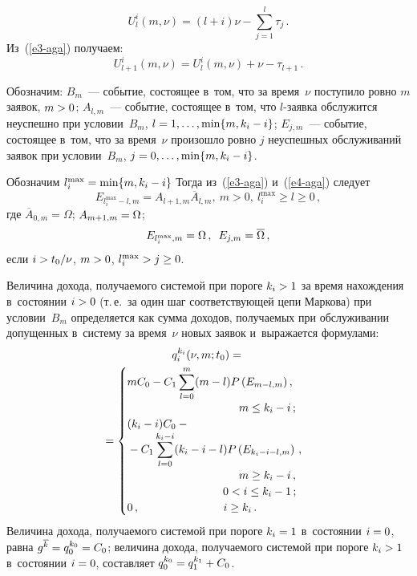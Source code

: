 \begin{multicols}{2}
  \noindent
  \begin{equation}
  U_l^i(m,\nu) =(l+i)\nu -\sum\limits_{j=1}^l \tau_j\,.
  \label{e3-aga}
  \end{equation}
Из~(\ref{e3-aga}) получаем:
\begin{equation}
U_{l+1}^i (m,\nu) =U_l^i(m,\nu) +\nu -\tau_{l+1}\,.
\label{e4-aga}
\end{equation}

  Обозначим: $B_m$~--- событие, состоящее в~том, что за время~$\nu$
поступило ровно $m$ заявок, $m\hm>0$; $A_{l,m}$~--- событие, состоящее в~том, что $l$-за\-яв\-ка обслужится неуспешно при условии~$B_m$, $l\hm=
1,\ldots, \min \{m,k_i\hm-i\}$; $E_{j,m}$~--- событие, состоящее в~том, что за
время~$\nu$ произошло ровно $j$ неуспешных обслуживаний заявок при
условии~$B_m$, $j\hm= 0,\ldots, \min \{m,k_i\hm-i\}$.

  Обозначим $l_i^{\max} \hm= \min \{m, k_i\hm-i\}$ Тогда из~(\ref{e3-aga})
и~(\ref{e4-aga}) следует
  \begin{equation}
  E_{l_i^{\max}-l,m}=A_{l+1,m} \overline{A}_{l,m},\ m>0,\ l_i^{\max} \geq
l\geq 0\,,
  \label{e5-aga}
   \end{equation}
где $\overline{A}_{0,m}=\Omega$; $A_{m+1,m}\hm= \Omega$;
$$
E_{l_i^{\max},m}=\Omega\,,\enskip E_{j,m}=\overline{\Omega}\,,
$$
 если $i\hm> t_0/\nu$, $m\hm> 0$, $l_i^{\max}\hm> j\hm\geq 0$.
 
 \columnbreak

  Величина дохода, получаемого системой при пороге $k_i\hm>1$ за время
нахождения в~состоянии $i\hm>0$ (т.\,е.\ за один шаг соответствующей цепи
Маркова) при условии~$B_m$ определяется как сумма доходов, получаемых
при обслуживании допущенных в~систему за время~$\nu$ новых заявок и~выражается формулами:
  \begin{multline}
  q_i^{k_i}(\nu,m;t_0) ={}\\
  {}=
  \begin{cases}
 mC_0-C_1 \displaystyle\sum\limits_{l=0}^m (m-l) P\left( E_{m-l,m}\right), &\\
   \hspace*{35mm}m\leq k_i-i\,;&\\
   (k_i-i) C_0 -{}\\
   {}-C_1\displaystyle\sum\limits_{l=0}^{k_i-i} (k_i-i-l) P\left( E_{k_i-i-l,m}\right)\,,\\
      \hspace*{35mm} m\geq k_i-i\,,&\\
   \hspace*{30mm}0<i\leq k_i-1\,;&\\
   0\,, &\hspace*{-28mm}i\geq k_i\,.
  \end{cases}
  \label{e6-aga}
  \end{multline}
Величина дохода, получаемого системой при пороге $k_i\hm=1$ в~состоянии
$i\hm=0$, равна $g^{\overline{k}}\hm= q_0^{k_0}\hm=C_0$; величина дохода,
получаемого системой при пороге $k_i\hm>1$ в~состоянии $i\hm=0$, составляет
$q_0^{k_0}\hm= q_1^{k_1}\hm+C_0$.


\end{multicols}

